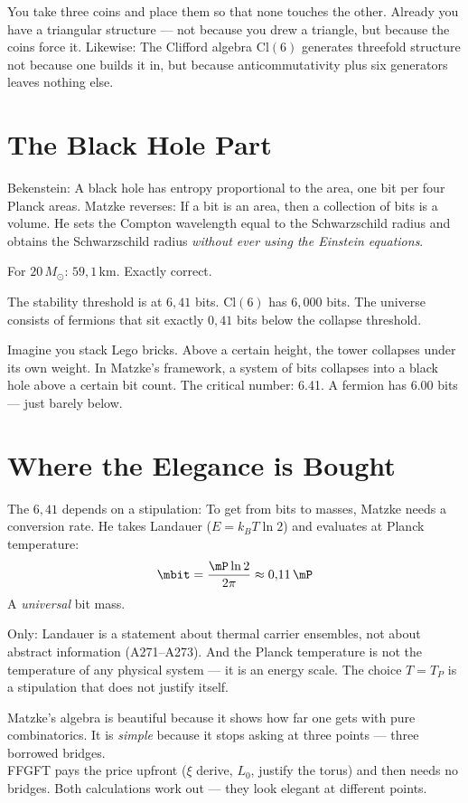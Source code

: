 \begin{laierspur}
You take three coins and place them so that none touches the other.
Already you have a triangular structure --- not because you drew a triangle,
but because the coins force it. Likewise: The Clifford algebra
$\mathrm{Cl}(6)$ generates threefold structure not because one builds it in,
but because anticommutativity plus six generators leaves nothing else.
\end{laierspur}

\section{The Black Hole Part}

Bekenstein: A black hole has entropy proportional to the area, one
bit per four Planck areas. Matzke reverses: If a bit is an area,
then a collection of bits is a volume. He sets the Compton wavelength
equal to the Schwarzschild radius and obtains the Schwarzschild radius
\emph{without ever using the Einstein equations}. 

For $20\,M_\odot$: $59{,}1$\,km. Exactly correct.

The stability threshold is at $6{,}41$ bits. $\mathrm{Cl}(6)$ has $6{,}000$
bits. The universe consists of fermions that sit exactly $0{,}41$ bits below
the collapse threshold.

\begin{laierspur}
Imagine you stack Lego bricks. Above a certain height,
the tower collapses under its own weight. In Matzke's framework,
a system of bits collapses into a black hole above a certain bit count.
The critical number: 6.41. A fermion has 6.00 bits ---
just barely below.
\end{laierspur}

\section{Where the Elegance is Bought}

The $6{,}41$ depends on a stipulation: To get from bits to masses,
Matzke needs a conversion rate. He takes Landauer ($E = k_BT\ln 2$)
and evaluates at Planck temperature:
\[
  \mbit = \frac{\mP \ln 2}{2\pi} \approx 0{,}11\,\mP
\]
A \emph{universal} bit mass. 

Only: Landauer is a statement about thermal carrier ensembles, not
about abstract information (A271--A273). And the Planck temperature is
not the temperature of any physical system --- it is an
energy scale. The choice $T = T_P$ is a stipulation that does not justify
itself.

\begin{keyresult}
Matzke's algebra is beautiful because it shows how far one gets with pure
combinatorics. It is \emph{simple} because it stops asking at three points
--- three borrowed bridges.\\[4pt]
FFGFT pays the price upfront ($\xi$ derive, $L_0$, justify the torus)
and then needs no bridges. Both calculations
work out --- they look elegant at different points.
\end{keyresult}
